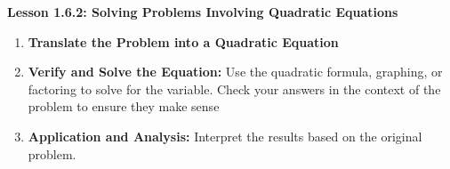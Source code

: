 \begin{center}
\textbf{Lesson 1.6.2: Solving Problems Involving Quadratic Equations}
\end{center}

\vspace*{1ex}


\begin{enumerate}[label = \color{blue}\arabic*. ]
\item \textbf{Translate the Problem into a Quadratic Equation}
\item \textbf{Verify and Solve the Equation:} Use the quadratic formula, graphing, or factoring to solve for the variable. Check your answers in the context of the problem to ensure they make sense 
\item \textbf{Application and Analysis:} Interpret the results based on the original problem.
\end{enumerate}





